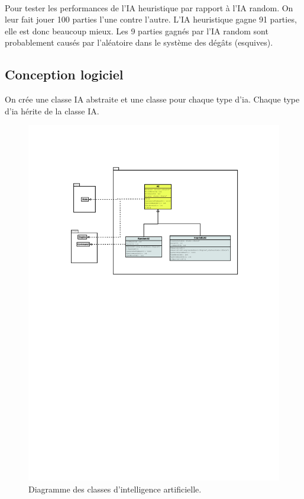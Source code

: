 \documentclass[a4paper,12pt]{article}
\begin{document}
\paragraph{} Pour tester les performances de l'IA heuristique par rapport à l'IA random. On leur fait jouer 100 parties l'une contre l'autre. L'IA heuristique gagne 91 parties, elle est donc beaucoup mieux. Les 9 parties gagnés par l'IA random sont probablement causés par l'aléatoire dans le système des dégâts (esquives). 
\subsection{Conception logiciel}

On crée une classe IA abstraite et une classe pour chaque type d'ia. Chaque type d'ia hérite de la classe IA.

\begin{landscape}
\begin{figure}[p]
\includegraphics[width=0.9\paperheight]{ai.pdf}
\caption{\label{uml:ai}Diagramme des classes d'intelligence artificielle.}
\end{figure}
\end{landscape}
\end{document}
